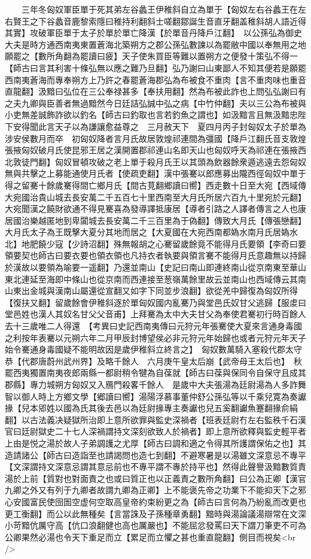 　　三年冬匈奴軍臣單于死其弟左谷蠡王伊稚斜自立為單于【匈奴左右谷蠡王在左右賢王之下谷蠡音鹿黎索隱曰稚持利翻斜士嗟翻鄒誕生音直牙翻盖稚斜胡人語近得其實】攻破軍臣單于太子於單於單亡降漢【於單音丹降戶江翻】　以公孫弘為御史大夫是時方通西南夷東置蒼海北築朔方之郡公孫弘數諫以為罷敝中國以奉無用之地願罷之【數所角翻為罷讀曰疲】天子使朱買臣等難以置朔方之便發十策弘不得一【師古曰言其利害十條弘無以應之難乃旦翻】弘乃謝曰山東鄙人不知其便若是願罷西南夷蒼海而專奉朔方上乃許之春罷蒼海郡弘為布被食不重肉【言不重肉味也重音直龍翻】汲黯曰弘位在三公奉禄甚多【奉扶用翻】然為布被此詐也上問弘弘謝曰有之夫九卿與臣善者無過黯然今日廷詰弘誠中弘之病【中竹仲翻】夫以三公為布被與小吏無差誠飾詐欲以釣名【師古曰釣取也言若釣魚之謂也】如汲黯言且無汲黯忠陛下安得聞此言天子以為謙讓愈益尊之　三月赦天下　夏四月丙子封匈奴太子於單為涉安侯數月而卒　初匈奴降者言月氏故居敦煌祁連間為彊國【降戶江翻氏音支敦煌張掖匈奴破月氏使昆邪王居之漢開置郡祁連山名即天山也匈奴呼天為祁連在張掖西北敦徒門翻】匈奴冒頓攻破之老上單于殺月氏王以其頭為飲器餘衆遁逃遠去怨匈奴無與共擊之上募能通使月氏者【使疏吏翻】漢中張騫以郎應募出隴西徑匈奴中單于得之留騫十餘歲騫得間亡鄉月氏【間古莧翻鄉讀曰嚮】西走數十日至大宛【西域傳大宛國治貴山城去長安萬二千五百七十里西南至大月氏所居六百九十里宛於元翻】大宛聞漢之饒財欲通不得見騫喜為發導譯抵康居【導者引路之人譯者傳言之人也康居國治樂越匿地到卑闐城去長安萬二千三百里為于偽翻】傳致大月氏【傳張戀翻】大月氏太子為王既擊大夏分其地而居之【大夏國在大宛西南都媯水南月氏居媯水北】地肥饒少寇【少詩沼翻】殊無報胡之心騫留歲餘竟不能得月氏要領【李奇曰要領要契也師古曰要衣要也領衣領也凡持衣者執要與領言騫不能得月氏意趣無以持歸於漢故以要領為喻要一遥翻】乃還並南山【史記曰南山即連終南山從京南東至華山東北連延至海即中條山也從京南而西連接至葱嶺萬餘里故云並南山也西域傳云其南山東出金城與漢南山屬還從宣翻又如字下同並步浪翻】欲從羌中歸復為匈奴所得【復扶又翻】留歲餘會伊稚斜逐於單匈奴國内亂騫乃與堂邑氏奴甘父逃歸【服䖍曰堂邑姓也漢人其奴名甘父父音甫】上拜騫為太中大夫甘父為奉使君騫初行時百餘人去十三歲唯二人得還　【考異曰史記西南夷傳曰元狩元年張騫使大夏來言通身毒國之利按年表騫以元朔六年二月甲辰封博望侯必非元狩元年始歸也或者元狩元年天子始令騫通身毒國疑不能明故因是歲伊稚斜立終言之】　匈奴數萬騎入塞殺代郡太守恭【代郡唐蔚州武州界】及略千餘人　六月庚午皇太后崩【武帝母王太后也】　秋罷西夷獨置南夷夜郎兩縣一都尉稍令犍為自葆就【師古曰葆與保同令自保守且成其郡縣】專力城朔方匈奴又入鴈門殺畧千餘人　是歲中大夫張湯為廷尉湯為人多詐舞智以御人時上方鄉文學【郷讀曰嚮】湯陽浮慕事董仲舒公孫弘等以千乘兒寛為奏讞掾【兒本郳姓以國為氏其後去邑以為廷尉掾專主奏讞也兒五奚翻讞魚蹇翻掾俞絹翻】以古法義决疑獄所治即上意所欲罪與監史深禍者【班表廷尉冇左右監秩千石漢官曰廷尉獄史二十七人深禍謂持文深刻欲致人於禍者】即上意所欲釋與監史輕平者上由是悦之湯於故人子弟調護之尤厚【師古曰調和適之令得其所護謂保佑之也】其造請諸公【師古曰造詣至也請謁問也造七到翻】不避寒暑是以湯雖文深意忌不專平【文深謂持文深意忌謂其意忌前也不專平謂不專於持平也】然得此聲譽汲黯數質責湯於上前【質對也對面責之也或曰質正也以正義責之數所角翻】曰公為正卿【漢官九卿之外又有列于九卿者故謂九卿為正卿】上不能褒先帝之功業下不能抑天下之邪心安國富民使囹圄空虚何空取高皇帝約束紛更之為【師古曰言何為乃紛亂而改更也更工衡翻】而公以此無種矣【言當誅及子孫種章勇翻】黯時與湯論議湯辯常在文深小苛黯伉厲守高【伉口浪翻健也高也厲嚴也】不能屈忿發罵曰天下謂刀筆吏不可為公卿果然必湯也令天下重足而立【累足而立懼之甚也重直龍翻】側目而視矣<br />
